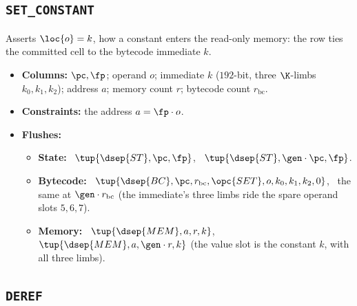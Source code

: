 \subsection{\texttt{SET\_CONSTANT}}\label{sec:tab-set}

Asserts $\loc{o}=k$, how a constant enters the read-only memory: the row ties the committed cell to the bytecode immediate $k$.
\begin{itemize}
\item \textbf{Columns:} $\pc,\fp$; operand $o$; immediate $k$ ($192$-bit, three $\K$-limbs $k_0,k_1,k_2$); address $a$; memory count $r$; bytecode count $r_{\mathrm{bc}}$.
\item \textbf{Constraints:} the address $a=\fp\cdot o$.
\item \textbf{Flushes:}
  \begin{itemize}
  \item \textbf{State:} \pull\ $\tup{\dsep{ST},\pc,\fp}$, \push\ $\tup{\dsep{ST},\gen\cdot\pc,\fp}$.
  \item \textbf{Bytecode:} \pull\ $\tup{\dsep{BC},\pc,r_{\mathrm{bc}},\opc{SET},o,k_0,k_1,k_2,0}$, \push\ the same at $\gen\cdot r_{\mathrm{bc}}$ (the immediate's three limbs ride the spare operand slots $5,6,7$).
  \item \textbf{Memory:} \pull\ $\tup{\dsep{MEM},a,r,k}$, \push\ $\tup{\dsep{MEM},a,\gen\cdot r,k}$ (the value slot is the constant $k$, with all three limbs).
  \end{itemize}
\end{itemize}

\subsection{\texttt{DEREF}}\label{sec:tab-deref}

